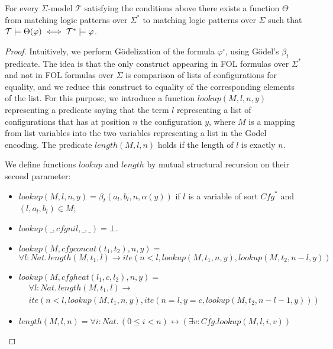 \begin{theorem}\label{thm:oracleLifting}
For every $\Sigma$-model $\mathcal{T}$
satisfying the conditions above
there exists a function $\Theta$ from matching logic patterns over $\Sigma^*$
to matching logic patterns over $\Sigma$ such that
$\mathcal{T} \models \Theta(\varphi) \iff \mathcal{T^*} \models \varphi$.
\end{theorem}
\begin{proof}
Intuitively, we perform Gödelization of the formula $\varphi^\square$, using Gödel's $\beta_t$ predicate.
The idea is that the only construct appearing in FOL formulas over $\Sigma^*$ and not in FOL formulas over $\Sigma$
is comparison of lists of configurations for equality, and we reduce this construct to equality of the corresponding
elements of the list.
For this purpose, we introduce a function $\mathit{lookup}(M, l, n, y)$ representing a predicate saying that
the term $l$ representing a list of configurations that has at position $n$ the configuration $y$,
where $M$ is a mapping from list variables into the two variables representing a list in the Godel encoding.
The predicate $\mathit{length}(M, l, n)$ holds if the length of $l$ is exactly $n$.

We define functions $\mathit{lookup}$ and $\mathit{length}$ by mutual structural recursion on their second parameter:
\begin{itemize}
    \item $\mathit{lookup}(M, l, n, y) = \beta_t(a_{l}, b_{l}, n, \alpha(y))$ if $l$ is a variable of sort $\mathit{Cfg}^*$ and $(l, a_{l}, b_{l}) \in M$;
    \item $\mathit{lookup}(\_, \mathit{cfgnil}, \_, \_) = \bot$.
    \item $\mathit{lookup}(M, \mathit{cfgconcat}(t_1, t_2), n, y) =$ \\
    $\forall l:\mathit{Nat}. \, \mathit{length}(M, t_1, l) \rightarrow \mathit{ite}(n < l, \mathit{lookup}(M, t_1, n, y), \mathit{lookup}(M, t_2, n-l, y))$
    \item $\mathit{lookup}(M, \mathit{cfgheat}(l_1, c, l_2), n, y) =$
    \begin{align*}
        & \forall l:\mathit{Nat}. \, \mathit{length}(M, t_1, l) \rightarrow \\
        & \mathit{ite}(n < l, \mathit{lookup}(M, t_1, n, y), \mathit{ite}(n = l, y = c, \mathit{lookup}(M, t_2, n-l-1, y)))
    \end{align*}    
    \item $\mathit{length}(M, l, n) = \forall i:\mathit{Nat}.\, (0 \leq i < n) \leftrightarrow (\exists v : \mathit{Cfg}. \mathit{lookup}(M, l, i, v))$
\end{itemize}


\end{proof}

